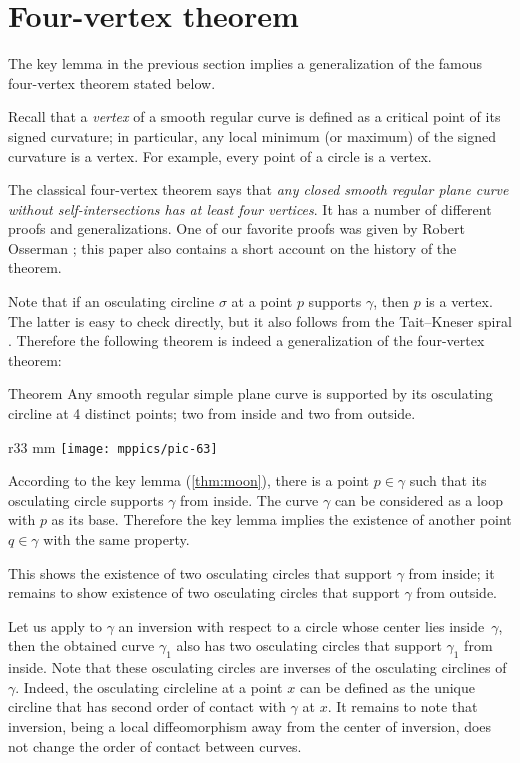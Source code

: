 \documentclass{article}
\begin{document}
\section{Four-vertex theorem}

The key lemma in the previous section implies a generalization of the famous four-vertex theorem stated below.

Recall that a \emph{vertex} of a smooth regular curve is defined as a critical point of its signed curvature;
in particular, any local minimum (or maximum) of the signed curvature is a vertex.
For example, every point of a circle is a vertex.

The classical four-vertex theorem says that \emph{any closed smooth regular plane curve without self-intersections has at least four vertices}.
It has a number of different proofs and generalizations.
One of our favorite proofs was given by Robert Osserman \cite{osserman}; this paper also contains a short account on the history of the theorem.

Note that if an osculating circline $\sigma$ at a point $p$ supports $\gamma$, then $p$ is a vertex.
The latter is easy to check directly, but it also follows from the Tait--Kneser spiral \cite{ghys-tabachnikov-timorin}.
Therefore the following theorem is indeed a generalization of the four-vertex theorem:

\begin{thm}{Theorem}\label{thm:4-vert}
Any smooth regular simple plane curve is supported by its osculating circline at 4 distinct points; two from inside and two from outside.
\end{thm}

\begin{wrapfigure}{r}{33 mm}
\vskip-0mm
\centering
\texttt{[image: mppics/pic-63]}
\vskip0mm
\end{wrapfigure}

According to the key lemma (\ref{thm:moon}), there is a point $p\in\gamma$ such that its osculating circle supports $\gamma$ from inside.
The curve $\gamma$ can be considered as a loop with $p$ as its base.
Therefore the key lemma implies the existence of another point $q\in\gamma$ with the same property.

This shows the existence of two osculating circles that support $\gamma$ from inside;
it remains to show existence of two osculating circles that support $\gamma$ from outside.

Let us apply to $\gamma$ an inversion with respect to a circle whose center lies inside~$\gamma$, then the obtained curve $\gamma_1$ also has  two osculating circles that support $\gamma_1$ from inside.
Note that these osculating circles are inverses of the osculating circlines of $\gamma$.
Indeed, the osculating circleline at a point $x$ can be defined as the unique circline that has second order of contact with $\gamma$ at $x$.
It remains to note that inversion, being a local diffeomorphism away from the center of inversion, does not change the order of contact between curves.
\end{document}
